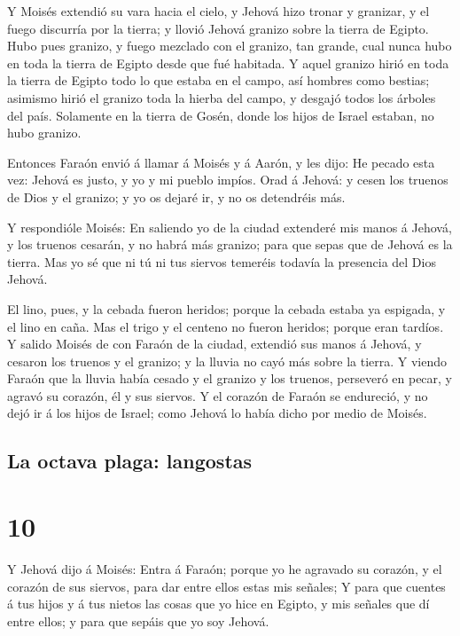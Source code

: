  Y Moisés extendió su vara hacia el cielo, y Jehová hizo
tronar y granizar, y el fuego discurría por la tierra; y llovió Jehová
granizo sobre la tierra de Egipto.  Hubo pues granizo, y
fuego mezclado con el granizo, tan grande, cual nunca hubo en toda la
tierra de Egipto desde que fué habitada.  Y aquel granizo
hirió en toda la tierra de Egipto todo lo que estaba en el campo, así
hombres como bestias; asimismo hirió el granizo toda la hierba del
campo, y desgajó todos los árboles del país.  Solamente
en la tierra de Gosén, donde los hijos de Israel estaban, no hubo
granizo.

 Entonces Faraón envió á llamar á Moisés y á Aarón, y les
dijo: He pecado esta vez: Jehová es justo, y yo y mi pueblo impíos.
 Orad á Jehová: y cesen los truenos de Dios y el granizo;
y yo os dejaré ir, y no os detendréis más.

 Y respondióle Moisés: En saliendo yo de la ciudad
extenderé mis manos á Jehová, y los truenos cesarán, y no habrá más
granizo; para que sepas que de Jehová es la tierra.  Mas
yo sé que ni tú ni tus siervos temeréis todavía la presencia del Dios
Jehová.

 El lino, pues, y la cebada fueron heridos; porque la
cebada estaba ya espigada, y el lino en caña.  Mas el
trigo y el centeno no fueron heridos; porque eran tardíos.
 Y salido Moisés de con Faraón de la ciudad, extendió sus
manos á Jehová, y cesaron los truenos y el granizo; y la lluvia no cayó
más sobre la tierra.  Y viendo Faraón que la lluvia había
cesado y el granizo y los truenos, perseveró en pecar, y agravó su
corazón, él y sus siervos.  Y el corazón de Faraón se
endureció, y no dejó ir á los hijos de Israel; como Jehová lo había
dicho por medio de Moisés.

\hypertarget{la-octava-plaga-langostas}{%
\subsection{La octava plaga:
langostas}\label{la-octava-plaga-langostas}}

\hypertarget{section-9}{%
\section{10}\label{section-9}}

 Y Jehová dijo á Moisés: Entra á Faraón; porque yo he
agravado su corazón, y el corazón de sus siervos, para dar entre ellos
estas mis señales;  Y para que cuentes á tus hijos y á tus
nietos las cosas que yo hice en Egipto, y mis señales que dí entre
ellos; y para que sepáis que yo soy Jehová.

